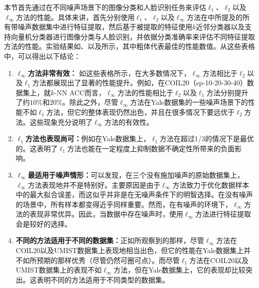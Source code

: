 本节首先通过在不同噪声场景下的图像分类和人脸识别任务来评估$\ell_{1}$、$\ell_{2}$以及$\ell_{\infty}$方法的性能。具体来讲，首先分别使用$\ell_{1}$、$\ell_{2}$以及$\ell_{\infty}$方法在中所提及的所有带噪声数据集中进行特征提取，然后基于被提取的特征使用$k$近邻分类器以及支持向量机分类器进行图像分类与人脸识别，并依据分类准确率来评估不同特征提取方法的性能。实验结果如、以及所示，其中粗体代表最佳的性能数值。从这些表格中，可以得出以下结论：
\begin{enumerate}
    \item \textbf{$\ell_{\infty}$方法非常有效：} 如这些表格所示，在大多数情况下，$\ell_{\infty}$方法相比于$\ell_{2}$以及$\ell_{1}$方法都展现出了显著的性能提升。例如，在COIL20（sp-10-20-30-40）数据集上，就$k$-NN ACC而言，$\ell_{\infty}$方法的性能相比于$\ell_{2}$以及$\ell_{1}$方法分别提升了约$10\%$和$20\%$。除此之外，尽管$\ell_{\infty}$方法在Yale数据集的一些噪声场景下的性能不如$\ell_{1}$方法，但它的整体表现仍然出色，并且在很多情况下要远优于$\ell_{2}$方法。这些现象充分说明了$\ell_{\infty}$方法的有效性。
    \item \textbf{$\ell_{1}$方法也表现尚可：}例如在Yale数据集上，$\ell_{1}$方法在超过1/3的情况下是最优的。这表明了$\ell_{1}$方法也能在一定程度上抑制数据不确定性所带来的负面影响。
    \item \textbf{$\ell_{\infty}$最适用于噪声情形：}可以发现，在三个没有施加噪声的原始数据集上，$\ell_{\infty}$方法表现地并不是特别好。主要原因是由于$\ell_{\infty}$方法致力于优化数据样本中的最大拟合误差，而这似乎并非是在无噪声条件下的明智选择。在没有噪声的场景中，所有样本都变得近乎同样重要。然而，在有噪声的环境下，$\ell_{\infty}$方法的表现非常优异。因此，当数据中存在噪声时，使用$\ell_{\infty}$方法进行特征提取会是较好的选择。
    \item \textbf{不同的方法适用于不同的数据集：}正如所观察到的那样，尽管$\ell_{\infty}$方法在COIL20以及UMIST数据集上表现地相当出色，但它的性能在Yale数据集上并不如所预期的那样优秀（尽管仍然可圈可点）。而尽管$\ell_{1}$方法在COIL20以及UMIST数据集上的表现不如$\ell_{\infty}$方法，但在Yale数据集上，它的表现却比较突出。这表明不同的方法适用于不同类型的数据集。
\end{enumerate}


